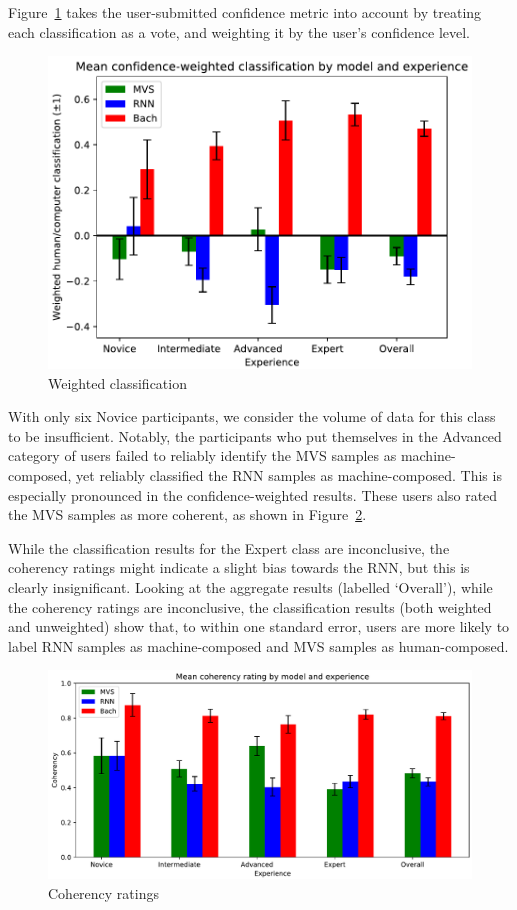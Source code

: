 \documentclass[12pt,a4paper,twoside,openright]{report}
\begin{document}
Figure~\ref{fig:weighted-classification} takes the user-submitted confidence
metric into account by treating each classification as a vote, and weighting it
by the user's confidence level.
\vspace{2mm}

\begin{figure}[H]
\centering
\includegraphics[width=340pt]{figs/weighted_human_classification.pdf}
\caption{Weighted classification}
\label{fig:weighted-classification}
\end{figure}
With only six Novice participants, we consider the volume of data for this class
to be insufficient. Notably, the participants who put themselves in the Advanced
category of users failed to reliably identify the MVS samples as
machine-composed, yet reliably classified the RNN samples as machine-composed.
This is especially pronounced in the confidence-weighted results. These users
also rated the MVS samples as more coherent, as shown in
Figure~\ref{fig:coherency}.

While the classification results for the Expert class are inconclusive, the
coherency ratings might indicate a slight bias towards the RNN, but this is
clearly insignificant. Looking at the aggregate results (labelled `Overall'),
while the coherency ratings are inconclusive, the classification results (both
weighted and unweighted) show that, to within one standard error, users are more
likely to label RNN samples as machine-composed and MVS samples as
human-composed.

\begin{figure}[H]
\centering
\includegraphics[width=0.75\linewidth]{figs/survey_coherency.pdf}
\caption{Coherency ratings}
\label{fig:coherency}
\end{figure}
\end{document}
